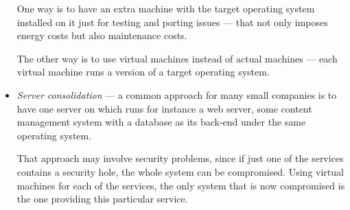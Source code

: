 \begin{itemize}
  One way  is to have  an extra machine  with the target  operating system
  installed on  it just for testing  and porting issues ---  that not only
  imposes energy  costs but also maintenance  costs.

  The other way is to use  virtual machines instead of actual machines ---
  each virtual machine runs a version of a target operating system.
\item  \emph{Server consolidation} ---  a common  approach for  many small
  companies is to have one server on which runs for instance a web server,
  some content management system with a database as its back-end under the
  same  operating system.

  That approach  may involve security problems,  since if just  one of the
  services   contains  a   security  hole,   the  whole   system   can  be
  compromised. Using virtual  machines for each of the  services, the only
  system  that is  now compromised  is the  one providing  this particular
  service.
\end{itemize}


